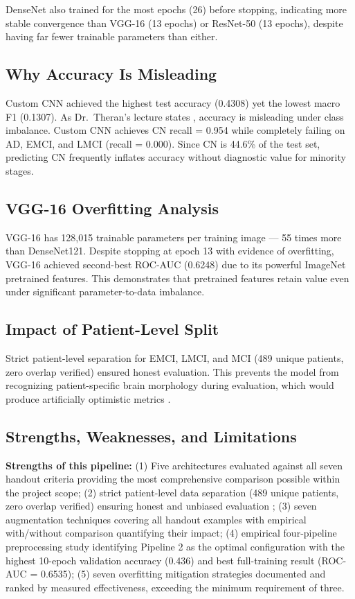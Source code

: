 \documentclass[12pt, a4paper]{article}
\begin{document}
DenseNet also trained for the most epochs (26) before
stopping, indicating more stable convergence than VGG-16
(13 epochs) or ResNet-50 (13 epochs), despite having far
fewer trainable parameters than either.

\subsection{Why Accuracy Is Misleading}

Custom CNN achieved the highest test accuracy (0.4308)
yet the lowest macro F1 (0.1307). As Dr.\ Theran's lecture
states \cite{theran2026metrics}, accuracy is misleading
under class imbalance. Custom CNN achieves CN recall =
0.954 while completely failing on AD, EMCI, and LMCI
(recall = 0.000). Since CN is 44.6\% of the test set,
predicting CN frequently inflates accuracy without
diagnostic value for minority stages.

\subsection{VGG-16 Overfitting Analysis}

VGG-16 has 128,015 trainable parameters per training
image --- 55 times more than DenseNet121. Despite stopping
at epoch 13 with evidence of overfitting, VGG-16 achieved
second-best ROC-AUC (0.6248) due to its powerful
ImageNet pretrained features. This demonstrates that
pretrained features retain value even under significant
parameter-to-data imbalance.

\subsection{Impact of Patient-Level Split}

Strict patient-level separation for EMCI, LMCI, and MCI
(489 unique patients, zero overlap verified) ensured
honest evaluation. This prevents the model from
recognizing patient-specific brain morphology during
evaluation, which would produce artificially optimistic
metrics \cite{lim2022}.

\subsection{Strengths, Weaknesses, and Limitations}

\textbf{Strengths of this pipeline:}
(1) Five architectures evaluated against all seven
handout criteria providing the most comprehensive
comparison possible within the project scope;
(2) strict patient-level data separation (489 unique
patients, zero overlap verified) ensuring honest
and unbiased evaluation \cite{lim2022};
(3) seven augmentation techniques covering all
handout examples with empirical with/without
comparison quantifying their impact;
(4) empirical four-pipeline preprocessing study
identifying Pipeline 2 as the optimal configuration
with the highest 10-epoch validation accuracy
(0.436) and best full-training result (ROC-AUC =
0.6535); (5) seven overfitting mitigation strategies
documented and ranked by measured effectiveness,
exceeding the minimum requirement of three.
\end{document}
